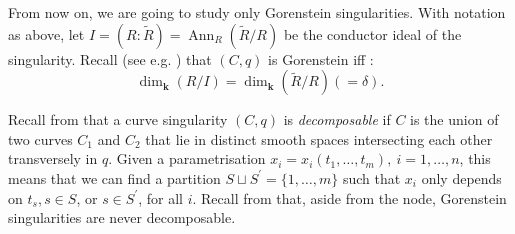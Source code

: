 \documentclass[11pt]{amsart}
\renewcommand{\k}{\mathbf k}
\newcommand{\tR}{\widetilde{R}}
\theoremstyle{plain}
\theoremstyle{definition}
\begin{document}
From now on, we are going to study only Gorenstein singularities. With notation as above, let $I=(R:\tilde R)=\operatorname{Ann}_R(\tilde R/R)$ be the conductor ideal of the singularity. Recall (see e.g. \cite[Theorem 6.4]{Hun}) that $(C,q)$ is Gorenstein iff :
\[\dim_\k(R/I)=\dim_\k(\tR/R)(=\delta).\]

Recall from \cite[Definition 2-1]{Stev} that a curve singularity $(C,q)$ is \emph{decomposable} if $C$ is the union of two curves $C_1$ and $C_2$ that lie in distinct smooth spaces intersecting each other transversely in $q$. Given a parametrisation $x_i=x_i(t_1,\ldots,t_m),\ i=1,\ldots,n$, this means that we can find a partition $S\sqcup S^\prime=\{1,\ldots,m\}$ such that $x_i$ only depends on $t_s,s\in S$, or $s\in S^\prime$, for all $i$. Recall from \cite[Proposition 2.1]{AFSGm} that, aside from the node, Gorenstein singularities are never decomposable.
\end{document}
